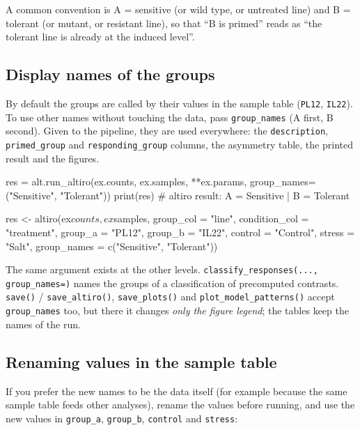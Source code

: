 \documentclass[11pt,a4paper]{article}
\newcommand{\code}[1]{\texttt{\color{navy!85!black}#1}}
\begin{document}
A common convention is A = sensitive (or wild type, or untreated line) and B = tolerant (or mutant,
or resistant line), so that ``B is primed'' reads as ``the tolerant line is already at the induced
level''.

\subsection{Display names of the groups}

By default the groups are called by their values in the sample table (\code{PL12}, \code{IL22}). To
use other names without touching the data, pass \code{group\_names} (A first, B second). Given to
the pipeline, they are used everywhere: the \code{description}, \code{primed\_group} and
\code{responding\_group} columns, the asymmetry table, the printed result and the figures.

\begin{pycode}
res = alt.run_altiro(ex.counts, ex.samples, **ex.params,
                     group_names=("Sensitive", "Tolerant"))
print(res)        # altiro result: A = Sensitive | B = Tolerant
\end{pycode}

\begin{rcode}
res <- altiro(ex$counts, ex$samples,
              group_col = "line", condition_col = "treatment",
              group_a = "PL12", group_b = "IL22",
              control = "Control", stress = "Salt",
              group_names = c("Sensitive", "Tolerant"))
\end{rcode}


The same argument exists at the other levels. \code{classify\_responses(..., group\_names=)} names the
groups of a classification of precomputed contrasts. \code{save()} / \code{save\_altiro()},
\code{save\_plots()} and \code{plot\_model\_patterns()} accept \code{group\_names} too, but there it
changes \emph{only the figure legend}; the tables keep the names of the run.

\subsection{Renaming values in the sample table}

If you prefer the new names to be the data itself (for example because the same sample table feeds
other analyses), rename the values before running, and use the new values in \code{group\_a},
\code{group\_b}, \code{control} and \code{stress}:
\end{document}
